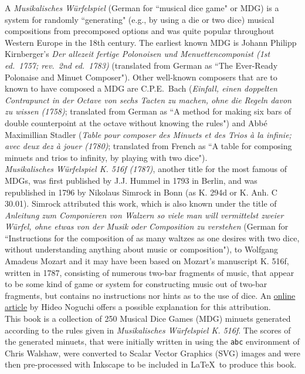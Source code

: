 \documentclass[letterpaper,x11names,svgnames,10pt]{article}
\begin{document}
A {\it Musikalisches W\"{u}rfelspiel} (German for ``musical dice game" or MDG) is a system for randomly ``generating" (e.g., by using a die or two dice) musical compositions from precomposed options and was quite popular throughout Western Europe in the 18th century.  The earliest known MDG is Johann Philipp Kirnberger's {\em Der allezeit fertige Polonoisen und Menuettencomponist (1st ed.\ 1757; rev.\ 2nd ed.\ 1783)} (translated from German as ``The Ever-Ready Polonaise and Minuet Composer").  Other well-known composers that are to known to have composed a MDG are C.P.E.\ Bach ({\em Einfall, einen doppelten Contrapunct in der Octave von sechs Tacten zu machen, ohne die Regeln davon zu wissen (1758)}; translated from German as ``A method for making six bars of double counterpoint at the octave without knowing the rules") and Abb\'{e} Maximillian Stadler ({\em Table pour composer des Minuets et des Trios \`{a} la infinie; avec deux dez \`{a} jouer (1780)}; translated from French as ``A table for composing minuets and trios to infinity, by playing with two dice"). \\

{\it Musikalisches W\"{u}rfelspiel K. 516f (1787)}, another title for the most famous of MDGs, was first published by J.J. Hummel in 1793 in Berlin, and was republished in 1796 by Nikolaus Simrock in Bonn (as K. 294d or K. Anh. C 30.01).  Simrock attributed this work, which is also known under the title of {\em Anleitung zum Componieren von Walzern so viele man will vermittelst zweier W\"{u}rfel, ohne etwas von der Musik oder Composition zu verstehen} (German for ``Instructions for the composition of as many waltzes as one desires with two dice, without understanding anything about music or composition"), to Wolfgang Amadeus Mozart and it may have been based on Mozart's manuscript K. 516f, written in 1787, consisting of numerous two-bar fragments of music, that appear to be some kind of game or system for constructing music out of two-bar fragments, but contains no instructions nor hints as to the use of dice.  An \href{(http://www.asahi-net.or.jp/\~rb5h-ngc/e/k516f.htm}{online article} by Hideo Noguchi offers a possible explanation for this attribution. \\

This book is a collection of 250 Musical Dice Games (MDG) minuets generated according to the rules given in {\it Musikalisches W\"{u}rfelspiel K. 516f}.  The scores of the generated minuets, that were initially written in using the \texttt{abc} environment of Chris Walshaw, were converted to Scalar Vector Graphics (SVG) images and were then pre-processed with Inkscape to be included in \LaTeX\ to produce this book.
\end{document}
